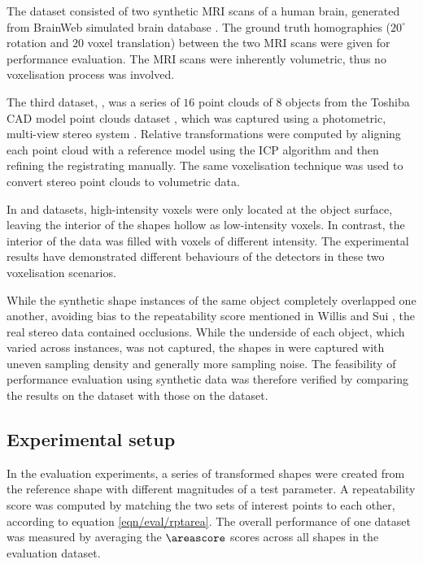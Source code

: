 The \mriset dataset consisted of two synthetic MRI scans of a human brain, generated from BrainWeb simulated brain database \cite{Cocosco1997}. The ground truth homographies ($20^{\circ}$ rotation and $20$ voxel translation) between the two MRI scans were given for performance evaluation. The MRI scans were inherently volumetric, thus no voxelisation process was involved. 

The third dataset, \stereoset, was a series of $16$ point clouds of $8$ objects from the Toshiba CAD model point clouds dataset \cite{Pham2011}, which was captured using a photometric, multi-view stereo system \cite{Vogiatzis2011}. Relative transformations were computed by aligning each point cloud with a reference model using the ICP algorithm \cite{Besl1992} and then refining the registrating manually. The same voxelisation technique was used to convert stereo point clouds to volumetric data.

In \meshset and \stereoset datasets, high-intensity voxels were only located at the object surface, leaving the interior of the shapes hollow as low-intensity voxels. In contrast, the interior of the \mriset data was filled with voxels of different intensity. The experimental results have demonstrated different behaviours of the detectors in these two voxelisation scenarios.

While the synthetic shape instances of the same object completely overlapped one another, avoiding bias to the repeatability score mentioned in Willis and Sui \cite{Willis2009}, the real stereo data contained occlusions. While the underside of each object, which varied across instances, was not captured, the shapes in \stereoset were captured with uneven sampling density and generally more sampling noise. The feasibility of performance evaluation using synthetic data was therefore verified by comparing the results on the \meshset dataset with those on the \stereoset dataset. 




\subsection{Experimental setup}
\label{sec/eval/variation}
In the evaluation experiments, a series of transformed shapes were created from the reference shape with different magnitudes of a test parameter. A repeatability score was computed by matching the two sets of interest points to each other, according to equation \ref{eqn/eval/rptarea}. The overall performance of one dataset was measured by averaging the $\areascore$ scores across all shapes in the evaluation dataset. 

